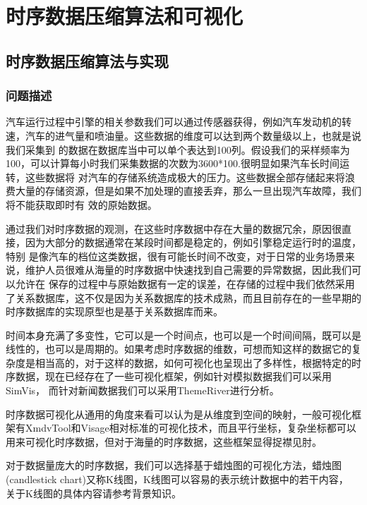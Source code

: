 
\chapter{时序数据压缩算法和可视化}
\label{Chapter 3}

\section{时序数据压缩算法与实现}
\label{section 3.1}
\subsection{问题描述}
\label{section 3.11}
汽车运行过程中引擎的相关参数我们可以通过传感器获得，例如汽车发动机的转速，汽车的进气量和喷油量。这些数据的维度可以达到两个数量级以上，也就是说我们采集到
的数据在数据库当中可以单个表达到100列。假设我们的采样频率为100，可以计算每小时我们采集数据的次数为3600*100.很明显如果汽车长时间运转，这些数据将
对汽车的存储系统造成极大的压力。这些数据全部存储起来将浪费大量的存储资源，但是如果不加处理的直接丢弃，那么一旦出现汽车故障，我们将不能获取即时有
效的原始数据。

通过我们对时序数据的观测，在这些时序数据中存在大量的数据冗余，原因很直接，因为大部分的数据通常在某段时间都是稳定的，例如引擎稳定运行时的温度，特别
是像汽车的档位这类数据，很有可能长时间不改变，对于日常的业务场景来说，维护人员很难从海量的时序数据中快速找到自己需要的异常数据，因此我们可以允许在
保存的过程中与原始数据有一定的误差，在存储的过程中我们依然采用了关系数据库，这不仅是因为关系数据库的技术成熟，而且目前存在的一些早期的时序数据库的实现原型也是基于关系数据库而来。


时间本身充满了多变性，它可以是一个时间点，也可以是一个时间间隔，既可以是线性的，也可以是周期的。如果考虑时序数据的维数，可想而知这样的数据它的复
杂度是相当高的，对于这样的数据，如何可视化也呈现出了多样性，根据特定的时序数据，现在已经存在了一些可视化框架，例如针对模拟数据我们可以采用SimVis，
而针对新闻数据我们可以采用ThemeRiver进行分析。

时序数据可视化从通用的角度来看可以认为是从维度到空间的映射，一般可视化框架有XmdvTool和Visage相对标准的可视化技术，而且平行坐标，复杂坐标都可以用来可视化时序数据，但对于海量的时序数据，这些框架显得捉襟见肘。

对于数据量庞大的时序数据，我们可以选择基于蜡烛图的可视化方法，蜡烛图(candlestick chart)又称K线图，K线图可以容易的表示统计数据中的若干内容，
关于K线图的具体内容请参考背景知识。


